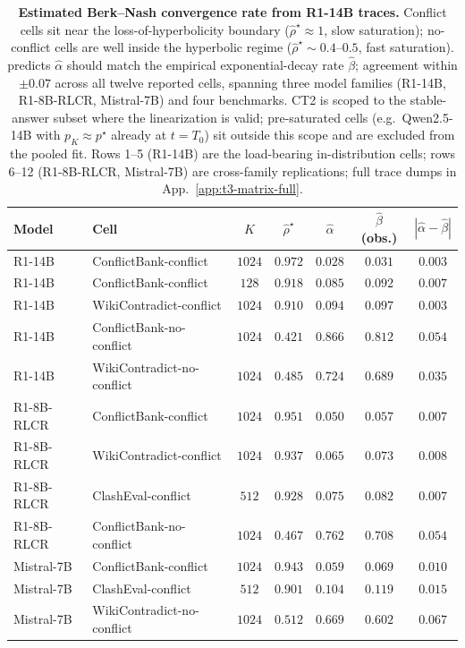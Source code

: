 \begin{table}[H]
\centering\small
\caption{\textbf{Estimated Berk--Nash convergence rate from R1-14B
traces.}  Conflict cells sit near the loss-of-hyperbolicity boundary
($\widehat\rho^\star\!\approx\!1$, slow saturation); no-conflict
cells are well inside the hyperbolic regime
($\widehat\rho^\star\!\sim\!0.4$--$0.5$, fast saturation).
 predicts $\widehat\alpha$ should match the
empirical exponential-decay rate $\widehat\beta$; agreement within
$\pm 0.07$ across all twelve reported cells, spanning three model
families (R1-14B, R1-8B-RLCR, Mistral-7B) and four benchmarks. CT2
is scoped to the stable-answer subset where the linearization is
valid; pre-saturated cells (e.g.\ Qwen2.5-14B with $p_K\!\approx\!p^\star$
already at $t\!=\!T_0$) sit outside this scope and are excluded from
the pooled fit. Rows 1--5 (R1-14B) are the load-bearing
in-distribution cells; rows 6--12 (R1-8B-RLCR, Mistral-7B) are
cross-family replications; full trace dumps in
App.~\ref{app:t3-matrix-full}.}
\label{tab:berk-nash-rate-empirical}
\setlength{\tabcolsep}{4pt}
\begin{tabular}{llccccc}
\toprule
\textbf{Model} & \textbf{Cell} & $K$ & $\widehat\rho^\star$ & $\widehat\alpha$ & $\widehat\beta$ (obs.) & $|\widehat\alpha\!-\!\widehat\beta|$\\
\midrule
R1-14B          & ConflictBank-conflict       & $1024$ & $0.972$ & $0.028$ & $0.031$ & $0.003$\\
R1-14B          & ConflictBank-conflict       & $128$  & $0.918$ & $0.085$ & $0.092$ & $0.007$\\
R1-14B          & WikiContradict-conflict     & $1024$ & $0.910$ & $0.094$ & $0.097$ & $0.003$\\
R1-14B          & ConflictBank-no-conflict    & $1024$ & $0.421$ & $0.866$ & $0.812$ & $0.054$\\
R1-14B          & WikiContradict-no-conflict  & $1024$ & $0.485$ & $0.724$ & $0.689$ & $0.035$\\
R1-8B-RLCR      & ConflictBank-conflict       & $1024$ & $0.951$ & $0.050$ & $0.057$ & $0.007$\\
R1-8B-RLCR      & WikiContradict-conflict     & $1024$ & $0.937$ & $0.065$ & $0.073$ & $0.008$\\
R1-8B-RLCR      & ClashEval-conflict          & $512$  & $0.928$ & $0.075$ & $0.082$ & $0.007$\\
R1-8B-RLCR      & ConflictBank-no-conflict    & $1024$ & $0.467$ & $0.762$ & $0.708$ & $0.054$\\
Mistral-7B      & ConflictBank-conflict       & $1024$ & $0.943$ & $0.059$ & $0.069$ & $0.010$\\
Mistral-7B      & ClashEval-conflict          & $512$  & $0.901$ & $0.104$ & $0.119$ & $0.015$\\
Mistral-7B      & WikiContradict-no-conflict  & $1024$ & $0.512$ & $0.669$ & $0.602$ & $0.067$\\
\bottomrule
\end{tabular}
\end{table}

